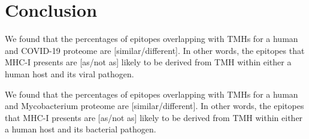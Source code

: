 \documentclass{article}
\newcommand{\richel}[1]{\textcolor{orange}{\textbf{[RB: #1]}}}
\begin{document}








\section{Conclusion}

We found that the percentages of epitopes overlapping 
with TMHs for a human and COVID-19 proteome are 
[similar/different]. In other words, the
epitopes that MHC-I presents are [as/not as] likely 
to be derived from TMH within either a human host and its viral pathogen.

We found that the percentages of epitopes overlapping 
with TMHs for a human and Mycobacterium proteome are 
[similar/different]. In other words, the
epitopes that MHC-I presents are [as/not as] likely 
to be derived from TMH within either a human host and its bacterial pathogen.


\end{document}
